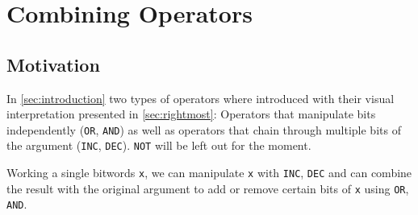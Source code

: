 \section{Combining Operators}\label{sec:combining}


\subsection*{Motivation}
In \autoref{sec:introduction} two types of operators where introduced
with their visual interpretation presented in \autoref{sec:rightmost}:
Operators that manipulate bits independently
(\lstinline$OR$, \lstinline$AND$)
as well as operators that chain through multiple bits of the argument
(\lstinline$INC$, \lstinline$DEC$).
\lstinline$NOT$ will be left out for the moment.

Working a single bitwords \lstinline$x$, we can
manipulate \lstinline$x$ with \lstinline$INC$, \lstinline$DEC$
and can combine the result with the original argument
to add or remove certain bits of \lstinline$x$
using \lstinline$OR$, \lstinline$AND$.
